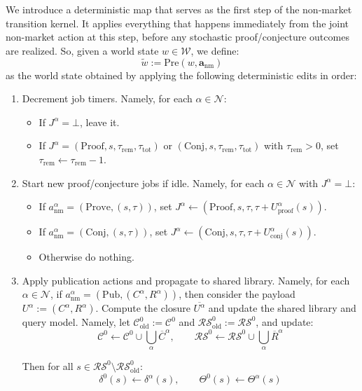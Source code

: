 \documentclass[letterpaper]{article} %
\begin{document}
 We introduce a deterministic map that serves as the first step of the non-market transition kernel. It applies everything that happens immediately from the joint non-market action at this step, before any stochastic proof/conjecture outcomes are realized. So, given a world state $w \in \mathcal{W}$, we define:
\[\tilde w := \mathrm{Pre}(w,\mathbf a_{\mathrm{nm}})\]
as the world state obtained by applying the following deterministic edits in order:
\begin{enumerate}
    \item Decrement job timers. Namely, for each $\alpha \in \mathcal{N}$:
    \begin{itemize}
        \item If $J^\alpha=\bot$, leave it.
	\item If $J^\alpha=(\mathrm{Proof},s,\tau_{\mathrm{rem}},\tau_{\mathrm{tot}})$ or $(\mathrm{Conj},s,\tau_{\mathrm{rem}},\tau_{\mathrm{tot}})$ with $\tau_{\mathrm{rem}}>0$, set
$\tau_{\mathrm{rem}}\leftarrow \tau_{\mathrm{rem}}-1$.
    \end{itemize}
\item Start new proof/conjecture jobs if idle. Namely, for each $\alpha \in \mathcal N$ with $J^\alpha=\bot$:
\begin{itemize}
    \item 	If $a^\alpha_{\mathrm{nm}}=(\mathrm{Prove},(s,\tau))$, set
$J^\alpha \leftarrow (\mathrm{Proof},s,\tau,\tau+U^\alpha_{\mathrm{proof}}(s))$.
	\item	If $a^\alpha_{\mathrm{nm}}=(\mathrm{Conj},(s,\tau))$, set
$J^\alpha \leftarrow (\mathrm{Conj},s,\tau,\tau+U^\alpha_{\mathrm{conj}}(s))$.
	\item	Otherwise do nothing.
\end{itemize}
\item Apply publication actions and propagate to shared library. Namely, for each $\alpha\in\mathcal{N}$, if $a^\alpha_{\mathrm{nm}}=(\mathrm{Pub},(C^\alpha,R^\alpha))$, then consider the payload $U^\alpha:=(C^\alpha,R^\alpha)$. Compute the closure $\overline{U^\alpha}$ and update the shared library and query model. Namely, let $\mathcal{C}^0_\mathrm{old} := \mathcal{C}^0$ and $\mathcal{RS}^0_\mathrm{old} := \mathcal{RS}^0$, and update:
\[\mathcal C^0 \leftarrow \mathcal C^0 \cup \bigcup_{\alpha}\overline C^\alpha,
\qquad
\mathcal{RS}^0 \leftarrow \mathcal{RS}^0 \cup \bigcup_{\alpha}\overline R^\alpha\]

Then for all $s \in \mathcal{RS}^0 \setminus \mathcal{RS}^0_\mathrm{old}$:
\[\delta^0(s) \leftarrow \delta^\alpha(s),\qquad  \Theta^0(s) \leftarrow \Theta^\alpha(s)\]


\end{enumerate}
\end{document}
